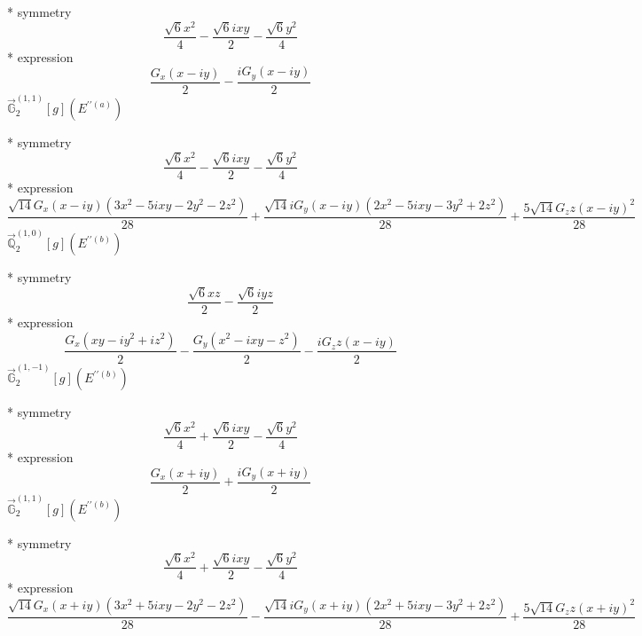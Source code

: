 \documentclass[fleqn,8pt]{jsarticle}
\begin{document}
\noindent\quad ** symmetry
\begin{dmath*}
\frac{\sqrt{6} x^{2}}{4} - \frac{\sqrt{6} i x y}{2} - \frac{\sqrt{6} y^{2}}{4}
\end{dmath*}
\noindent\quad ** expression
\begin{dmath*}
\frac{G_{x} \left(x - i y\right)}{2} - \frac{i G_{y} \left(x - i y\right)}{2}
\end{dmath*}
\noindent\quad $\vec{\mathbb{G}}_{2}^{(1,1)}[g](E^{\prime\prime(a)})$

\noindent\quad ** symmetry
\begin{dmath*}
\frac{\sqrt{6} x^{2}}{4} - \frac{\sqrt{6} i x y}{2} - \frac{\sqrt{6} y^{2}}{4}
\end{dmath*}
\noindent\quad ** expression
\begin{dmath*}
\frac{\sqrt{14} G_{x} \left(x - i y\right) \left(3 x^{2} - 5 i x y - 2 y^{2} - 2 z^{2}\right)}{28} + \frac{\sqrt{14} i G_{y} \left(x - i y\right) \left(2 x^{2} - 5 i x y - 3 y^{2} + 2 z^{2}\right)}{28} + \frac{5 \sqrt{14} G_{z} z \left(x - i y\right)^{2}}{28}
\end{dmath*}
\noindent\quad $\vec{\mathbb{Q}}_{2}^{(1,0)}[g](E^{\prime\prime(b)})$

\noindent\quad ** symmetry
\begin{dmath*}
\frac{\sqrt{6} x z}{2} - \frac{\sqrt{6} i y z}{2}
\end{dmath*}
\noindent\quad ** expression
\begin{dmath*}
\frac{G_{x} \left(x y - i y^{2} + i z^{2}\right)}{2} - \frac{G_{y} \left(x^{2} - i x y - z^{2}\right)}{2} - \frac{i G_{z} z \left(x - i y\right)}{2}
\end{dmath*}
\noindent\quad $\vec{\mathbb{G}}_{2}^{(1,-1)}[g](E^{\prime\prime(b)})$

\noindent\quad ** symmetry
\begin{dmath*}
\frac{\sqrt{6} x^{2}}{4} + \frac{\sqrt{6} i x y}{2} - \frac{\sqrt{6} y^{2}}{4}
\end{dmath*}
\noindent\quad ** expression
\begin{dmath*}
\frac{G_{x} \left(x + i y\right)}{2} + \frac{i G_{y} \left(x + i y\right)}{2}
\end{dmath*}
\noindent\quad $\vec{\mathbb{G}}_{2}^{(1,1)}[g](E^{\prime\prime(b)})$

\noindent\quad ** symmetry
\begin{dmath*}
\frac{\sqrt{6} x^{2}}{4} + \frac{\sqrt{6} i x y}{2} - \frac{\sqrt{6} y^{2}}{4}
\end{dmath*}
\noindent\quad ** expression
\begin{dmath*}
\frac{\sqrt{14} G_{x} \left(x + i y\right) \left(3 x^{2} + 5 i x y - 2 y^{2} - 2 z^{2}\right)}{28} - \frac{\sqrt{14} i G_{y} \left(x + i y\right) \left(2 x^{2} + 5 i x y - 3 y^{2} + 2 z^{2}\right)}{28} + \frac{5 \sqrt{14} G_{z} z \left(x + i y\right)^{2}}{28}
\end{dmath*}
\end{document}

